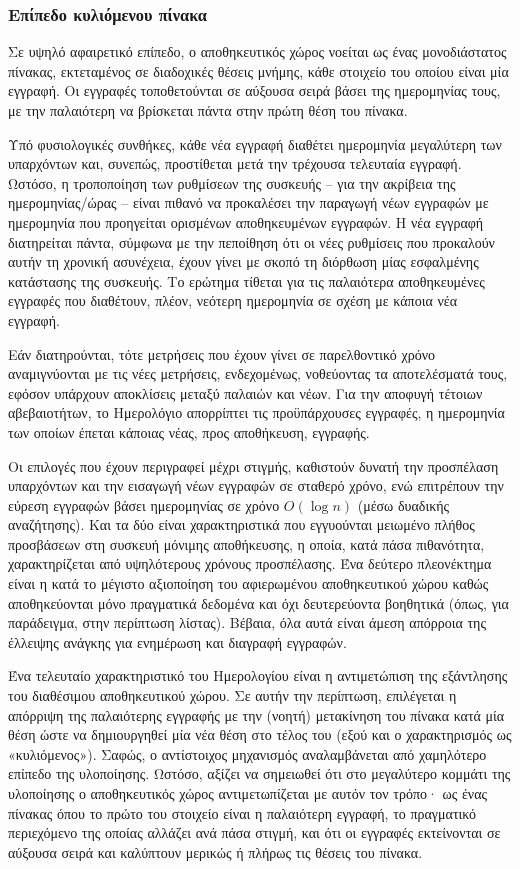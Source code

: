 \subsubsection{Επίπεδο κυλιόμενου πίνακα}
Σε υψηλό αφαιρετικό επίπεδο, ο αποθηκευτικός χώρος νοείται ως ένας μονοδιάστατος
πίνακας, εκτεταμένος σε διαδοχικές θέσεις μνήμης, κάθε στοιχείο του οποίου είναι
μία εγγραφή. Οι εγγραφές τοποθετούνται σε αύξουσα σειρά βάσει της ημερομηνίας
τους, με την παλαιότερη να βρίσκεται πάντα στην πρώτη θέση του πίνακα.

Υπό φυσιολογικές συνθήκες, κάθε νέα εγγραφή διαθέτει ημερομηνία μεγαλύτερη των
υπαρχόντων και, συνεπώς, προστίθεται μετά την τρέχουσα τελευταία εγγραφή.
Ωστόσο, η τροποποίηση των ρυθμίσεων της συσκευής -- για την ακρίβεια της
ημερομηνίας\slash ώρας --  είναι πιθανό να προκαλέσει την παραγωγή νέων εγγραφών
με ημερομηνία που προηγείται ορισμένων αποθηκευμένων εγγραφών. Η νέα εγγραφή
διατηρείται πάντα, σύμφωνα με την πεποίθηση ότι οι νέες ρυθμίσεις που προκαλούν
αυτήν τη χρονική ασυνέχεια, έχουν γίνει με σκοπό τη διόρθωση μίας εσφαλμένης
κατάστασης της συσκευής. Το ερώτημα τίθεται για τις παλαιότερα αποθηκευμένες
εγγραφές που διαθέτουν, πλέον, νεότερη ημερομηνία σε σχέση με κάποια νέα
εγγραφή.

Εάν διατηρούνται, τότε μετρήσεις που έχουν γίνει σε παρελθοντικό χρόνο
αναμιγνύονται με τις νέες μετρήσεις, ενδεχομένως, νοθεύοντας τα αποτελέσματά
τους, εφόσον υπάρχουν αποκλίσεις μεταξύ παλαιών και νέων. Για την αποφυγή
τέτοιων αβεβαιοτήτων, το Ημερολόγιο απορρίπτει τις προϋπάρχουσες εγγραφές, η
ημερομηνία των οποίων έπεται κάποιας νέας, προς αποθήκευση, εγγραφής.

Οι επιλογές που έχουν περιγραφεί μέχρι στιγμής, καθιστούν δυνατή την προσπέλαση
υπαρχόντων και την εισαγωγή νέων εγγραφών σε σταθερό χρόνο, ενώ επιτρέπουν την
εύρεση εγγραφών βάσει ημερομηνίας σε χρόνο $O(\log n)$ (μέσω δυαδικής
αναζήτησης). Και τα δύο είναι χαρακτηριστικά που εγγυούνται μειωμένο πλήθος
προσβάσεων στη συσκευή μόνιμης αποθήκευσης, η οποία, κατά πάσα πιθανότητα,
χαρακτηρίζεται από υψηλότερους χρόνους προσπέλασης. Ένα δεύτερο πλεονέκτημα
είναι η κατά το μέγιστο αξιοποίηση του αφιερωμένου αποθηκευτικού χώρου καθώς
αποθηκεύονται μόνο πραγματικά δεδομένα και όχι δευτερεύοντα βοηθητικά (όπως, για
παράδειγμα, στην περίπτωση λίστας). Βέβαια, όλα αυτά είναι άμεση απόρροια της
έλλειψης ανάγκης για ενημέρωση και διαγραφή εγγραφών.

Ένα τελευταίο χαρακτηριστικό του Ημερολογίου είναι η αντιμετώπιση της εξάντλησης
του διαθέσιμου αποθηκευτικού χώρου. Σε αυτήν την περίπτωση, επιλέγεται η
απόρριψη της παλαιότερης εγγραφής με την (νοητή) μετακίνηση του πίνακα κατά μία
θέση ώστε να δημιουργηθεί μία νέα θέση στο τέλος του (εξού και ο χαρακτηρισμός
ως «κυλιόμενος»). Σαφώς, ο αντίστοιχος μηχανισμός αναλαμβάνεται από χαμηλότερο
επίπεδο της υλοποίησης. Ωστόσο, αξίζει να σημειωθεί ότι στο μεγαλύτερο κομμάτι
της υλοποίησης ο αποθηκευτικός χώρος αντιμετωπίζεται με αυτόν τον τρόπο· ως ένας
πίνακας όπου το πρώτο του στοιχείο είναι η παλαιότερη εγγραφή, το πραγματικό
περιεχόμενο της οποίας αλλάζει ανά πάσα στιγμή, και ότι οι εγγραφές εκτείνονται
σε αύξουσα σειρά και καλύπτουν μερικώς ή πλήρως τις θέσεις του πίνακα.


